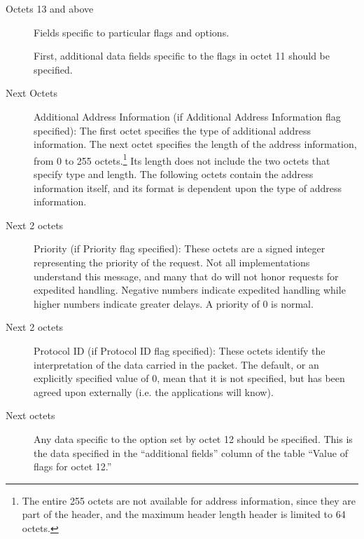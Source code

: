 
\begin{description}
\item[Octets 13 and above] Fields specific to particular flags and options.

First, additional data fields  specific to the flags in octet 11
should be specified. 

\item[Next Octets] Additional Address Information (if Additional
Address Information flag specified):  The first octet specifies the
type of additional address information.  The next octet specifies the
length of the address information, from 0 to 255 octets.\footnote{The
entire 255 octets are not available for address information, since they
are part of the header, and the maximum header length header is
limited to 64 octets.}
  Its length
does not include the two octets that specify type and length.   The following
octets contain the address information itself, and its format is
dependent upon the type of address information.  

\item[Next 2 octets] Priority (if Priority flag specified):
These octets are a signed integer representing the priority of the
request.  Not all implementations understand this message, and many
that do will not honor requests for expedited handling.  Negative
numbers indicate expedited handling while higher numbers indicate
greater delays.  A priority of 0 is normal.

\item[Next 2 octets] Protocol ID (if Protocol ID flag specified):
These octets identify the interpretation of the data carried in the
packet.  The default, or an explicitly specified value of 0,  mean
that it is not specified, but has been agreed upon externally (i.e.
the applications will know). 

\item[Next octets] Any data specific to the option set by octet 12
should be specified.  This is the data specified in the ``additional
fields'' column of the table ``Value of flags for octet 12.''

\end{description}

